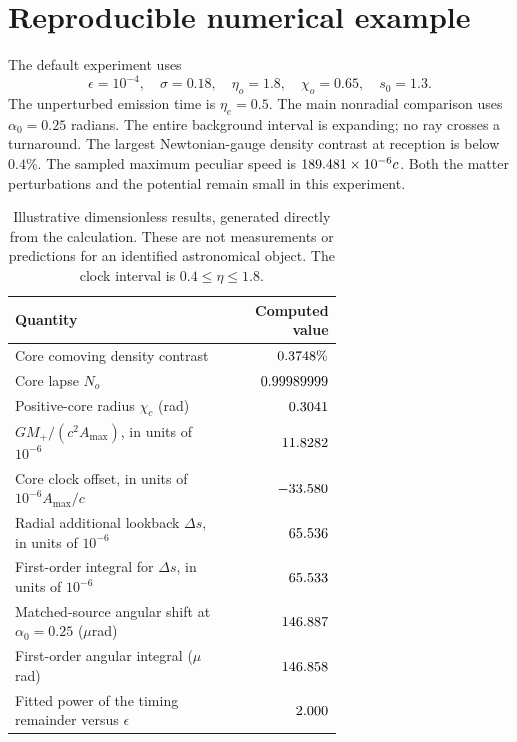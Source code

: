 \section{Reproducible numerical example}
\label{sec:results}
The default experiment uses
\begin{equation}
 \epsilon=10^{-4},\quad\sigma=0.18,\quad\eta_o=1.8,\quad
 \chi_o=0.65,\quad s_0=1.3.
\end{equation}
The unperturbed emission time is $\eta_e=0.5$.
The main nonradial comparison uses $\alpha_0=0.25$ radians.
The entire background interval is expanding; no ray crosses a turnaround.
The largest Newtonian-gauge density contrast at reception is below
$0.4\%$. The sampled maximum peculiar speed is
$189.481\times10^{-6}c$. Both the matter perturbations and
the potential remain small in this experiment.

\begin{table}[htbp]
 \centering\small
 \begin{tabular}{@{}p{0.65\linewidth}r@{}}
 \toprule
 Quantity & Computed value\\
 \midrule
 Core comoving density contrast & $0.3748\%$\\
 Core lapse $N_o$ & $0.99989999$\\
 Positive-core radius $\chi_c$ (rad) & $0.3041$\\
 $GM_+/(c^2A_{\max})$, in units of $10^{-6}$ & $11.8282$\\
 Core clock offset, in units of $10^{-6}A_{\max}/c$ & $-33.580$\\
 Radial additional lookback $\Delta s$, in units of $10^{-6}$ & $65.536$\\
 First-order integral for $\Delta s$, in units of $10^{-6}$ & $65.533$\\
 Matched-source angular shift at $\alpha_0=0.25$ ($\mu$rad) & $146.887$\\
 First-order angular integral ($\mu$rad) & $146.858$\\
 Fitted power of the timing remainder versus $\epsilon$ & $2.000$\\
 \bottomrule
 \end{tabular}
 \caption{Illustrative dimensionless results, generated directly from
 the calculation. These are not measurements or predictions for an
 identified astronomical object. The clock interval is $0.4\leq\eta\leq1.8$.}
 \label{tab:results}
\end{table}

